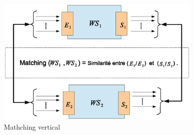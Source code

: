 
\begin{figure}[h]
    \centering
    \includegraphics[width=0.9\textwidth]{figs/matching-general.eps}
    \caption{Mathching vertical}
    \label{fig:matching-general}
\end{figure}

